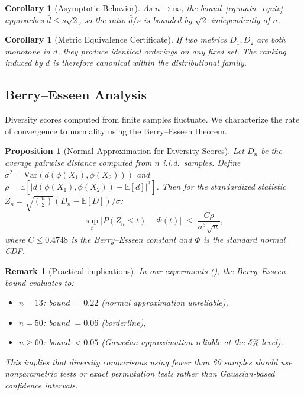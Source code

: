 \documentclass[11pt,a4paper]{article}
\newtheorem{corollary}[theorem]{Corollary}
\newtheorem{proposition}[theorem]{Proposition}
\newtheorem{remark}[theorem]{Remark}
\newcommand{\E}{\mathbb{E}}
\newcommand{\Var}{\mathrm{Var}}
\begin{document}
\begin{corollary}[Asymptotic Behavior]\label{cor:asymptotic}
As $n \to \infty$, the bound~\eqref{eq:main_equiv}
approaches $\bar{d} \leq s\sqrt{2}$, so the ratio
$\bar{d}/s$ is bounded by $\sqrt{2}$ independently of $n$.
\end{corollary}

\begin{corollary}[Metric Equivalence Certificate]\label{cor:equiv}
If two metrics $D_1, D_2$ are both monotone in $\bar{d}$,
they produce identical orderings on any fixed set.
The ranking induced by $\bar{d}$ is therefore canonical
within the distributional family.
\end{corollary}

\subsection{Berry--Esseen Analysis}\label{sec:berry_esseen}

Diversity scores computed from finite samples fluctuate.
We characterize the rate of convergence to normality
using the Berry--Esseen theorem.

\begin{proposition}[Normal Approximation for Diversity Scores]
\label{prop:berry_esseen}
Let $D_n$ be the average pairwise distance computed from
$n$ i.i.d.\ samples.  Define $\sigma^2 = \Var(d(\phi(X_1),
\phi(X_2)))$ and $\rho = \E[|d(\phi(X_1), \phi(X_2)) -
\E[d]|^3]$.  Then for the standardized statistic
$Z_n = \sqrt{\binom{n}{2}}(D_n - \E[D]) / \sigma$:
\begin{equation}
  \sup_t \bigl| P(Z_n \leq t) - \Phi(t) \bigr|
  \;\leq\;
  \frac{C \rho}{\sigma^3 \sqrt{n}},
\end{equation}
where $C \leq 0.4748$ is the Berry--Esseen constant and
$\Phi$ is the standard normal CDF.
\end{proposition}

\begin{remark}[Practical implications]
In our experiments (), the Berry--Esseen
bound evaluates to:
\begin{itemize}[leftmargin=2em,itemsep=1pt]
\item $n = 13$: bound $= 0.22$ (normal approximation unreliable),
\item $n = 50$: bound $= 0.06$ (borderline),
\item $n \geq 60$: bound $< 0.05$ (Gaussian approximation reliable
      at the 5\% level).
\end{itemize}
This implies that diversity comparisons using fewer than 60
samples should use nonparametric tests or exact permutation
tests rather than Gaussian-based confidence intervals.
\end{remark}
\end{document}
